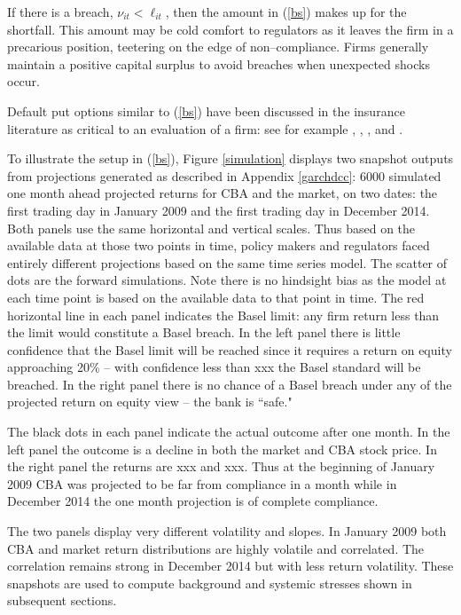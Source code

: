 \documentclass[authoryear]{elsarticle}
\newcommand{\eref}[1]{(\ref{#1})}
\newcommand{\fref}[1]{Figure \ref{#1}}
\newcommand{\aref}[1]{Appendix \ref{#1}}
\begin{document}
If there is a breach, $\nu_{it}<\ell_{it}$, then the amount in \eref{bs} makes up for the shortfall.   This amount may be cold comfort to regulators as it leaves the firm in a precarious position, teetering on the edge of non--compliance. Firms generally maintain a positive capital surplus to avoid breaches when unexpected shocks occur.

Default put options similar to \eref{bs} have been discussed in the insurance literature as critical to an evaluation of a firm:  see for
example \citet{merton1977analytic}, \citet{doherty1986price}, \citet{cummins1988risk}, \citet{myers2001capital} and \citet{sherris2006solvency}.

To illustrate the setup in \eref{bs}, \fref{simulation}   displays two snapshot outputs from projections generated as described  in \aref{garchdcc}:  6000  simulated one month ahead projected returns for  CBA and the market, on  two dates: the first trading day in January 2009 and the first trading day in December 2014.    Both panels use the same horizontal and vertical scales.   Thus based on the available data at those two points in  time, policy makers and regulators faced entirely different projections based on the same time series model.   The scatter of dots are the forward simulations.  Note there is no hindsight bias as the model at each time point is based on the available data to that point in time.    The red horizontal line in each panel indicates the Basel limit:  any firm return less than the limit would constitute a Basel breach.   In the left panel there is little confidence that the Basel limit will be reached since it requires a return on equity approaching 20\% -- with confidence less than xxx the Basel standard will be breached.  In the right panel there is no chance of a Basel breach under any of the projected return on equity view -- the bank is ``safe."

 The black dots in each panel indicate the actual outcome after one month.    In the left panel the outcome is a decline in both  the market and CBA stock price.    In the right panel the returns are xxx and xxx.    Thus at the beginning of January  2009 CBA was projected to be far from compliance in a month while in December 2014 the one month projection is of complete compliance.

 The two panels  display very different volatility and slopes. In January 2009 both CBA and market return distributions are highly volatile and correlated. The correlation remains strong in December 2014 but with less return volatility. These snapshots are used to compute background and systemic stresses shown in subsequent sections.
\end{document}
